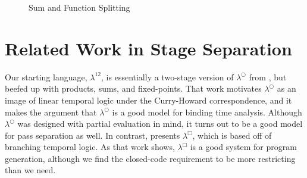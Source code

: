 \documentclass{article}
\begin{document}
\begin{figure*}
\caption{Sum and Function Splitting}
\label{fig:advancedTypes}
\end{figure*}

\section{Related Work in Stage Separation}

Our starting language, $\lambda^{12}$, is essentially a two-stage version of $\lambda^\bigcirc$ from \cite{davies96}, but beefed up with products, sums, and fixed-points.  That work motivates $\lambda^\bigcirc$ as an image of linear temporal logic under the Curry-Howard correspondence, and it makes the argument that $\lambda^\bigcirc$ is a good model for binding time analysis.  Although $\lambda^\bigcirc$ was designed with partial evaluation in mind, it turns out to be a good model for pass separation as well.  In contrast, \cite{davies01} presents $\lambda^\Box$, which is based off of branching temporal logic.  As that work shows, $\lambda^\Box$ is a good system for program generation, although we find the closed-code requirement to be more restricting than we need.
\end{document}
